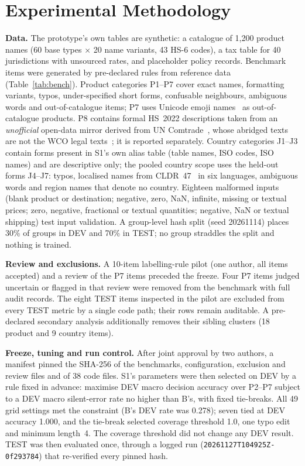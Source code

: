 \documentclass[conference]{IEEEtran}
\begin{document}
\section{Experimental Methodology}
\textbf{Data.} The prototype's own tables are synthetic: a catalogue of 1{,}200 product names (60 base types $\times$ 20
name variants, 43 HS-6 codes), a tax table for 40 jurisdictions with unsourced rates, and placeholder policy records.
Benchmark items were generated by pre-declared rules from reference data (Table~\ref{tab:bench}). Product categories
P1--P7 cover exact names, formatting variants, typos, under-specified short forms, confusable neighbours, ambiguous words
and out-of-catalogue items; P7 uses Unicode emoji names~\cite{unicodeemoji} as out-of-catalogue products. P8 contains
formal HS~2022 descriptions taken from an \emph{unofficial} open-data mirror derived from UN Comtrade~\cite{hsmirror},
whose abridged texts are not the WCO legal texts~\cite{wcohs2022}; it is reported separately. Country categories J1--J3
contain forms present in S1's own alias table (table names, ISO codes, ISO names) and are descriptive only; the pooled
country scope uses the held-out forms J4--J7: typos, localised names from CLDR~47~\cite{cldr} in six languages,
ambiguous words and region names that denote no country. Eighteen malformed inputs (blank product or destination; negative, zero, NaN, infinite, missing or textual
prices; zero, negative, fractional or textual quantities; negative, NaN or textual shipping) test input validation. A group-level hash split (seed 20261114) places 30\% of groups in DEV and 70\% in TEST; no group
straddles the split and nothing is trained.



\textbf{Review and exclusions.} A 10-item labelling-rule pilot (one author, all items accepted) and a review of the P7
items preceded the freeze. Four P7 items judged uncertain or flagged in that review were removed from the benchmark with full audit
records. The eight TEST items inspected in the pilot are excluded from every TEST metric by a single code path; their rows
remain auditable. A pre-declared secondary analysis additionally removes their sibling clusters (18 product and 9
country items).

\textbf{Freeze, tuning and run control.} After joint approval by two authors, a manifest pinned the SHA-256 of the
benchmarks, configuration, exclusion and review files and of 38 code files. S1's parameters were then selected on DEV
by a rule fixed in advance: maximise DEV macro decision accuracy over P2--P7 subject to a DEV macro silent-error rate no
higher than B's, with fixed tie-breaks. All 49 grid settings met the constraint (B's DEV rate was 0.278); seven tied at
DEV accuracy 1.000, and the tie-break selected coverage threshold 1.0, one typo edit and minimum length~4. The coverage
threshold did not change any DEV result. TEST was then evaluated once, through a logged run
(\texttt{20261127T104925Z-0f293784}) that re-verified every pinned hash.
\end{document}

